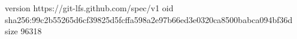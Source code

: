 version https://git-lfs.github.com/spec/v1
oid sha256:99c2b55265d6cf39825d5fcffa598a2e97b66ed3e0320ca8500babca094bf36d
size 96318
